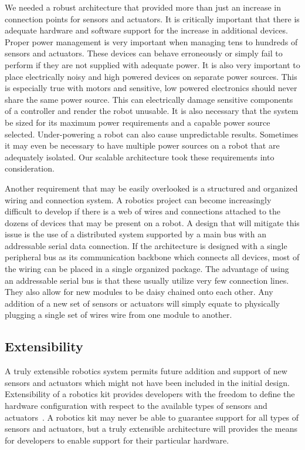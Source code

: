  We needed a robust architecture that provided more than just an increase in connection points for sensors and actuators. It is critically important that there is adequate hardware and software support for the increase in additional devices. Proper power management is very important when managing tens to hundreds of sensors and actuators. These devices can behave erroneously or simply fail to perform if they are not supplied with adequate power. It is also very important to place electrically noisy and high powered devices on separate power sources. This is especially true with motors and sensitive, low powered electronics should never share the same power source. This can electrically damage sensitive components of a controller and render the robot unusable. It is also necessary that the system be sized for its maximum power requirements and a capable power source selected. Under-powering a robot can also cause unpredictable results. Sometimes it may even be necessary to have multiple power sources on a robot that are adequately isolated. Our scalable architecture took these requirements into consideration.

Another requirement that may be easily overlooked is a structured and organized wiring and connection system. A robotics project can become increasingly difficult to develop if there is a web of wires and connections attached to the dozens of devices that may be present on a robot. A design that will mitigate this issue is the use of a distributed system supported by a main bus with an addressable serial data connection. If the architecture is designed with a single peripheral bus as its communication backbone which connects all devices, most of the wiring can be placed in a single organized package. The advantage of using an addressable serial bus is that these usually utilize very few connection lines. They also allow for new modules to be daisy chained onto each other. Any addition of a new set of sensors or actuators will simply equate to physically plugging a single set of wires wire from one module to another.




\subsection{Extensibility} %
\label{sub:extensibility}
A truly extensible robotics system permits future addition and support of new sensors and actuators which might not have been included in the initial design. Extensibility of a robotics kit provides developers with the freedom to define the hardware configuration with respect to the available types of sensors and actuators~\parencite{rdk}. A robotics kit may never be able to guarantee support for all types of sensors and actuators, but a truly extensible architecture will provides the means for developers to enable support for their particular hardware. 

